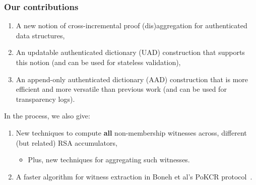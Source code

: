 \begin{frame}
    \frametitle{Our contributions}
    \begin{enumerate}
        \item A new notion of \alert{cross-incremental proof (dis)aggregation} for authenticated data structures\pause,
        \item An \alert{updatable authenticated dictionary (UAD)} construction that supports this notion (and can be used for stateless validation)\pause,
        \item An \alert{append-only authenticated dictionary (AAD)} construction that is more efficient and more versatile than previous work (and can be used for transparency logs).\pause
    \end{enumerate}
    In the process, we also give:\pause
    \begin{enumerate}
        \item New techniques to compute \textbf{all} non-membership witnesses across, different (but related) RSA accumulators\pause,
        \begin{itemize}
            \item Plus, new techniques for aggregating such witnesses.\pause
        \end{itemize}
        \item A faster algorithm for witness extraction in Boneh et al's \alert{PoKCR} protocol~\cite{BBF18}.
    \end{enumerate}
\end{frame}